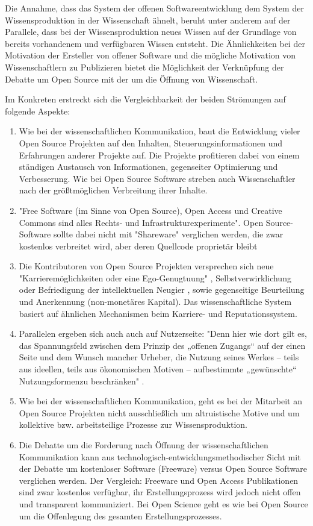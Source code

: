 Die Annahme, dass das System der offenen Softwareentwicklung dem System der Wissensproduktion in der Wissenschaft ähnelt, beruht unter anderem auf der Parallele, dass bei der Wissensproduktion neues Wissen auf der Grundlage von bereits vorhandenem und verfügbaren Wissen entsteht. Die Ähnlichkeiten bei der Motivation der Ersteller von offener Software und die mögliche Motivation von Wissenschaftlern zu Publizieren bietet die Möglichkeit der Verknüpfung der Debatte um Open Source mit der um die Öffnung von Wissenschaft.

Im Konkreten erstreckt sich die Vergleichbarkeit der beiden Strömungen auf folgende Aspekte:
\begin{enumerate}
\item Wie bei der wissenschaftlichen Kommunikation, baut die Entwicklung vieler Open Source Projekten auf den Inhalten, Steuerungsinformationen und Erfahrungen anderer Projekte auf. Die Projekte profitieren dabei von einem ständigen Austausch von Informationen, gegenseiter Optimierung und Verbesserung. Wie bei Open Source Software streben auch Wissenschaftler nach der größtmöglichen Verbreitung ihrer Inhalte.
\item "Free Software (im Sinne von Open Source), Open Access und Creative Commons sind alles Rechts- und Infrastrukturexperimente"\cite{kelty_2004}. Open Source-Software sollte dabei nicht mit "Shareware" verglichen werden, die zwar kostenlos verbreitet wird, aber deren Quellcode proprietär bleibt \cite{Lerner_2001}
\item Die Kontributoren von Open Source Projekten versprechen sich neue "Karrieremöglichkeiten oder eine Ego-Genugtuung" \cite{Lerner_2001}, Selbstverwirklichung oder Befriedigung der intellektuellen Neugier \cite{Willinsky_2005}, sowie gegenseitige Beurteilung und Anerkennung (non-monetäres Kapital). Das wissenschaftliche System basiert auf ähnlichen Mechanismen beim Karriere- und Reputationssystem.
\item Parallelen ergeben sich auch auch auf Nutzerseite: "Denn hier wie dort gilt es, das Spannungsfeld zwischen dem Prinzip des „offenen Zugangs“ auf der einen Seite und dem Wunsch mancher Urheber, die Nutzung seines Werkes – teils aus ideellen, teils aus ökonomischen Motiven – aufbestimmte „gewünschte“ Nutzungsformenzu beschränken" \cite{dorschel_2006_open}.
\item Wie bei der wissenschaftlichen Kommunikation, geht es bei der Mitarbeit an Open Source Projekten nicht ausschließlich um altruistische Motive \cite{Lerner_2001} und um kollektive bzw. arbeitsteilige Prozesse zur Wissensproduktion.
\item Die Debatte um die Forderung nach Öffnung der wissenschaftlichen Kommunikation kann aus technologisch-entwicklungsmethodischer Sicht mit der Debatte um kostenloser Software (Freeware) versus Open Source Software verglichen werden. Der Vergleich: Freeware und Open Access Publikationen sind zwar kostenlos verfügbar, ihr Erstellungsprozess wird jedoch nicht offen und transparent kommuniziert. Bei Open Science geht es wie bei Open Source um die Offenlegung des gesamten Erstellungsprozesses.
\end{enumerate}

